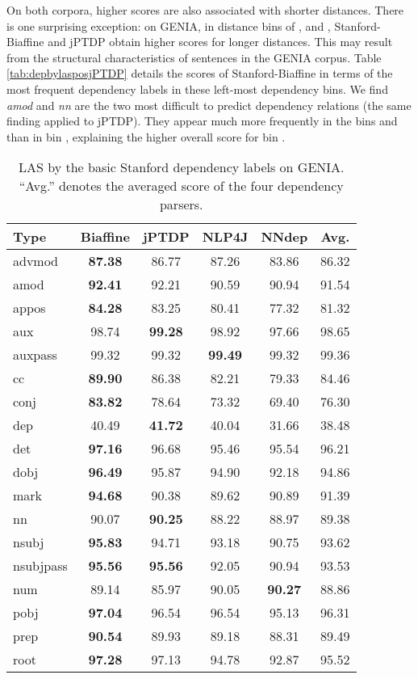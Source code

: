 \documentclass[twocolumn,hyperref]{bmcart}\pdfoutput=1
\newcommand{\CHANGEA}[1]{#1}
\begin{document}
On both corpora,  higher scores are also associated with shorter distances. There is one  surprising  exception:  on GENIA, in  
distance bins of ,  and  , Stanford-Biaffine and jPTDP obtain higher scores for longer distances.   This may result from the structural characteristics of sentences in the GENIA corpus. \CHANGEA{Table \ref{tab:depbylasposjPTDP} details the scores  of Stanford-Biaffine in terms of the most frequent dependency labels in these left-most dependency bins.}  We find \textit{amod} and \textit{nn} are the two most difficult to predict dependency relations \CHANGEA{(the same finding applied to jPTDP)}. They appear much more frequently in the bins  and  than in  bin  , explaining the higher overall score for bin  . 



\begin{table}[!t]
\caption{LAS  by  the basic Stanford dependency labels on GENIA. ``Avg.'' denotes the averaged score of the four dependency parsers. }
\centering
\begin{tabular}{l|c|c|c|c|c}
\hline
Type & Biaffine	& jPTDP	& NLP4J	& NNdep & Avg. \\
\hline
advmod	 & \textbf{87.38}	 & 86.77	 & 87.26	 & 83.86 & 86.32 \\
amod	 & \textbf{92.41}	 & 92.21	 & 90.59	 & 90.94 & 91.54 \\
appos & 	\textbf{84.28} & 	83.25 & 	80.41 & 	77.32 &81.32  \\
aux & 	98.74	 & \textbf{99.28} & 	98.92 & 	97.66 & 98.65 \\
auxpass & 	99.32	 & 99.32 & 	\textbf{99.49}	 & 99.32 & 99.36 \\
cc & 	\textbf{89.90}	 & 86.38 & 	82.21	 & 79.33 &84.46  \\
conj & 	\textbf{83.82}	 & 78.64	 & 73.32	 & 69.40 & 76.30 \\
dep	 & 40.49 & 	\textbf{41.72}	 & 40.04	 & 31.66 &  38.48\\
det	 & \textbf{97.16}	 & 96.68	 & 95.46 & 	95.54  &96.21 \\
dobj & 	\textbf{96.49}	 & 95.87	 & 94.90	 & 92.18  &94.86 \\
mark & \textbf{94.68}  & 90.38 & 89.62 & 90.89  & 91.39 \\
nn	 & 90.07	 & \textbf{90.25}	 & 88.22 & 	88.97 & 89.38 \\
nsubj	 & \textbf{95.83}	 & 94.71	 & 93.18	 & 90.75 & 93.62 \\
nsubjpass & 	\textbf{95.56}	 & \textbf{95.56}	 & 92.05 & 	90.94 &  93.53\\
num	 & 89.14	 & 85.97	 & {90.05} & 	\textbf{90.27} &  88.86\\
pobj	 & \textbf{97.04} & 	96.54 & 	96.54	 & 95.13 & 96.31 \\
prep & 	\textbf{90.54} & 	89.93 & 	89.18 & 	88.31 &  89.49\\
root	 & \textbf{97.28} & 	97.13 & 	94.78 & 	92.87 & 95.52 \\
\hline
\end{tabular}
\label{tab:LAS_GENIA_DepTypes}
\end{table}
\end{document}
